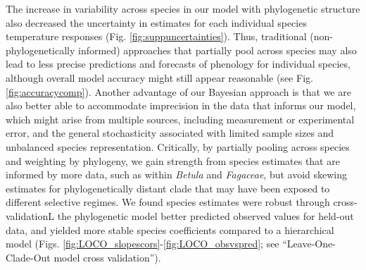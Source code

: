 \documentclass[11pt]{article}
\begin{document}
The increase in variability across species in our model with phylogenetic structure also decreased the uncertainty in estimates for each individual species temperature responses (Fig. \ref{fig:suppuncertainties}). Thus, traditional (non-phylogenetically informed) approaches that partially pool across species  \cite[most hierarchical models in ecology, e.g.,][]{flynn2018,ettinger2020} may also lead to less precise predictions and forecasts of phenology for individual species, although overall model accuracy might still appear reasonable (see Fig. \ref{fig:accuracycomp}). Another advantage of our Bayesian approach is that we are also better able to accommodate imprecision in the data that informs our model, which might arise from multiple sources, including measurement or experimental error, and the general stochasticity associated with limited sample sizes and unbalanced species representation. Critically, by partially pooling across species and weighting by phylogeny, we gain strength from species estimates that are informed by more data, such as within \emph{Betula} and \emph{Fagaceae}, but avoid skewing estimates for phylogenetically distant clade that may have been exposed to different selective regimes. We found species estimates were robust through cross-validationL the phylogenetic model better predicted observed values for held-out data, and yielded more stable species coefficients compared to a hierarchical model (Figs. \ref{fig:LOCO_slopescors}-\ref{fig:LOCO_obsvspred}; see ``Leave-One-Clade-Out model cross validation''). %


\end{document}
